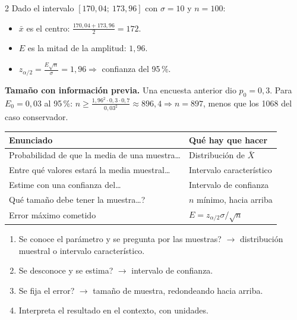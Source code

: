 \documentclass[10pt]{article}
\begin{document}
\begin{multicols}{2}
Dado el intervalo \([170{,}04;\ 173{,}96]\) con \(\sigma=10\) y \(n=100\):
\begin{itemize}
  \item \(\bar x\) es el centro: \(\frac{170{,}04+173{,}96}2=172\).
  \item \(E\) es la mitad de la amplitud: \(1{,}96\).
  \item \(z_{\alpha/2}=\frac{E\sqrt n}{\sigma}=1{,}96\Rightarrow\) confianza del 95\,\%.
\end{itemize}
\begin{ejemplo}
\textbf{Tamaño con información previa.} Una encuesta anterior dio \(p_0=0{,}3\). Para \(E_0=0{,}03\) al 95\,\%: \(n\ge\frac{1{,}96^2\cdot0{,}3\cdot0{,}7}{0{,}03^2}\approx896{,}4\Rightarrow n=897\), menos que los 1068 del caso conservador.
\end{ejemplo}

\begin{tabular}{@{}p{3.6cm}p{4.2cm}@{}}
\textbf{Enunciado} & \textbf{Qué hay que hacer}\\ \hline
\guillemotleft{}Probabilidad de que la media de una muestra\ldots\guillemotright{} & Distribución de \(\bar X\)\\
\guillemotleft{}Entre qué valores estará la media muestral\ldots\guillemotright{} & Intervalo característico\\
\guillemotleft{}Estime con una confianza del\ldots\guillemotright{} & Intervalo de confianza\\
\guillemotleft{}\textquestiondown{}Qué tamaño debe tener la muestra\ldots?\guillemotright{} & \(n\) mínimo, hacia arriba\\
\guillemotleft{}Error máximo cometido\guillemotright{} & \(E=z_{\alpha/2}\sigma/\sqrt n\)
\end{tabular}

\begin{enumerate}
  \item \textquestiondown{}Se conoce el parámetro y se pregunta por las muestras? \(\to\) distribución muestral o intervalo característico.
  \item \textquestiondown{}Se desconoce y se estima? \(\to\) intervalo de confianza.
  \item \textquestiondown{}Se fija el error? \(\to\) tamaño de muestra, redondeando hacia arriba.
  \item Interpreta el resultado en el contexto, con unidades.
\end{enumerate}


\end{multicols}
\end{document}
